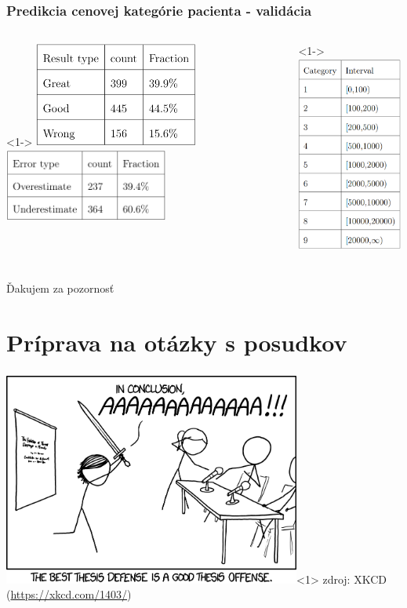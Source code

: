 \documentclass[slovak,10pt]{beamer}
\begin{document}
\begin{frame}
	\frametitle{Predikcia cenovej kategórie pacienta - validácia}
	\begin{columns}[T]%
		\begin{column}{.44\textwidth}<1->%
			\includegraphics[height=3.46cm]{images/tot_res_1.png}
			\includegraphics[height=2.4cm]{images/tot_res_2.png}
		\end{column}
		\hfill%
		\begin{column}{.32\textwidth}<1->%
			\includegraphics[height=6.4cm]{images/tot_cat.png}
		\end{column}  
	\end{columns}
\end{frame}


\begin{frame}
	\frametitle{}
	
	\large{Ďakujem za pozornosť}
\end{frame}

\section{Príprava na otázky s posudkov}

\begin{frame}
	\frametitle{}

	\includegraphics[height=7cm]{images/thesis_defense_2x.png}<1>
	zdroj: XKCD (\url{https://xkcd.com/1403/})
\end{frame}
\end{document}
